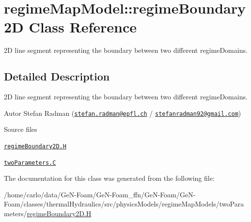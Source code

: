 \hypertarget{classFoam_1_1regimeMapModel_1_1regimeBoundary2D}{}\section{regime\+Map\+Model\+:\+:regime\+Boundary2D Class Reference}
\label{classFoam_1_1regimeMapModel_1_1regimeBoundary2D}


2D line segment representing the boundary between two different regime\+Domains.  




\subsection{Detailed Description}
2D line segment representing the boundary between two different regime\+Domains. 

\label{_Description}%
 Autor Stefan Radman (\href{mailto:stefan.radman@epfl.ch}{\tt stefan.\+radman@epfl.\+ch} / \href{mailto:stefanradman92@gmail.com}{\tt stefanradman92@gmail.\+com})

\begin{DoxyParagraph}{Source files}

\begin{DoxyItemize}
\item \href{../../../home/carlo/data/GeN-Foam/GeN-Foam_ffn/GeN-Foam/GeN-Foam/classes/thermalHydraulics/src/physicsModels/regimeMapModels/twoParameters/regimeBoundary2D.H}{\tt regime\+Boundary2\+D.\+H} 
\item \href{../../../home/carlo/data/GeN-Foam/GeN-Foam_ffn/GeN-Foam/GeN-Foam/classes/thermalHydraulics/src/physicsModels/regimeMapModels/twoParameters/twoParameters.C}{\tt two\+Parameters.\+C} 
\end{DoxyItemize}
\end{DoxyParagraph}


The documentation for this class was generated from the following file\+:\begin{DoxyCompactItemize}
\item 
/home/carlo/data/\+Ge\+N-\/\+Foam/\+Ge\+N-\/\+Foam\+\_\+ffn/\+Ge\+N-\/\+Foam/\+Ge\+N-\/\+Foam/classes/thermal\+Hydraulics/src/physics\+Models/regime\+Map\+Models/two\+Parameters/\hyperlink{regimeBoundary2D_8H}{regime\+Boundary2\+D.\+H}\end{DoxyCompactItemize}
